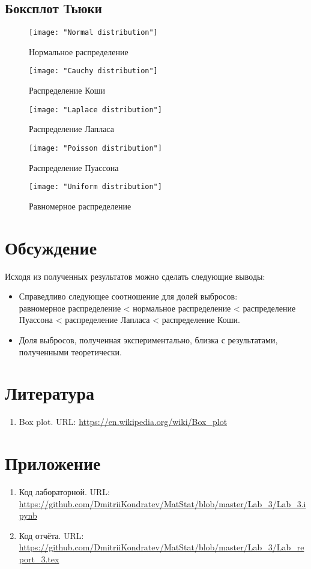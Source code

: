 \documentclass[12pt,a4paper]{article}
\begin{document}
	\subsection{Боксплот Тьюки}
	\begin{center}
		\begin{figure}[h!]
			\texttt{[image: "Normal distribution"]} 
			\caption[Нормальное распределение]{Нормальное распределение}
		\end{figure}
		
		\newpage
		\begin{figure}[h!]
			\texttt{[image: "Cauchy distribution"]}
			\caption[Распределение Коши]{Распределение Коши}
			
			\texttt{[image: "Laplace distribution"]}
			\caption[Распределение Лапласа]{Распределение Лапласа}
		\end{figure}
		
		\newpage
		\begin{figure}[h!]
			\texttt{[image: "Poisson distribution"]}
			\caption[Распределение Пуассона]{Распределение Пуассона}
			
			\texttt{[image: "Uniform distribution"]}
			\caption[Равномерное распределение]{Равномерное распределение}
		\end{figure}
	\end{center}

	\section{Обсуждение}
	Исходя из полученных результатов можно сделать следующие выводы:
	\begin{itemize}
		\item Справедливо следующее соотношение для долей выбросов:\\
		равномерное распределение < нормальное распределение < распределение Пуассона < распределение Лапласа < распределение Коши.
		
		\item Доля выбросов, полученная экспериментально, близка с результатами, полученными теоретически.
	\end{itemize}
	
	\section{Литература}
	\begin{enumerate}
		\item \label{Box plot} Box plot. URL: \url{https://en.wikipedia.org/wiki/Box_plot}
	\end{enumerate}

	\section{Приложение}
	\begin{enumerate}
		\item Код лабораторной. URL: \url{https://github.com/DmitriiKondratev/MatStat/blob/master/Lab_3/Lab_3.ipynb}
		
		\item Код отчёта. URL: \url{https://github.com/DmitriiKondratev/MatStat/blob/master/Lab_3/Lab_report_3.tex}
		
	\end{enumerate}
\end{document}
